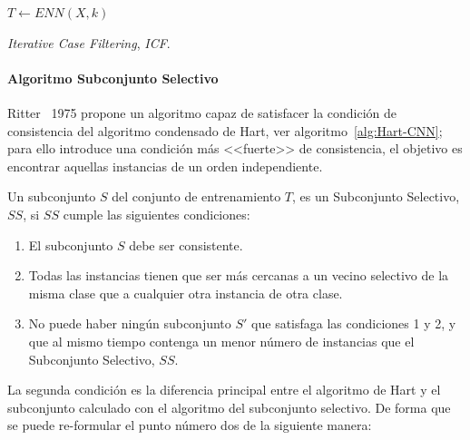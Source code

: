 \begin{algorithm}[H]
  	\BlankLine
  $T \leftarrow ENN(X,k)$\\  	
	\caption{\textit{Iterative Case Filtering}, \textit{ICF}.}\label{alg:Brighton-ICF}
\end{algorithm}

\paragraph{Algoritmo Subconjunto Selectivo}\label{paragraph:SS}
\hfill \break
Ritter~\cite{ritter1975algorithm} 1975 propone un algoritmo capaz de satisfacer la condición de consistencia del algoritmo condensado de Hart, ver algoritmo~\ref{alg:Hart-CNN}; para ello introduce una condición más <<fuerte>> de consistencia, el objetivo es encontrar aquellas instancias de un orden independiente. 

Un subconjunto $S$ del conjunto de entrenamiento $T$, es un Subconjunto Selectivo, $SS$, si $SS$ cumple las siguientes condiciones:
\begin{enumerate}
\item El subconjunto $S$ debe ser consistente.
\item Todas las instancias tienen que ser más cercanas a un vecino selectivo de la misma clase que a cualquier otra instancia de otra clase.
\item No puede haber ningún subconjunto $S'$ que satisfaga las condiciones 1 y 2, y que al mismo tiempo contenga un menor número de instancias que el Subconjunto Selectivo, $SS$.
\end{enumerate}

La segunda condición es la diferencia principal entre el algoritmo de Hart y el subconjunto calculado con el algoritmo del subconjunto selectivo. De forma que se puede re-formular el punto número dos de la siguiente manera:

